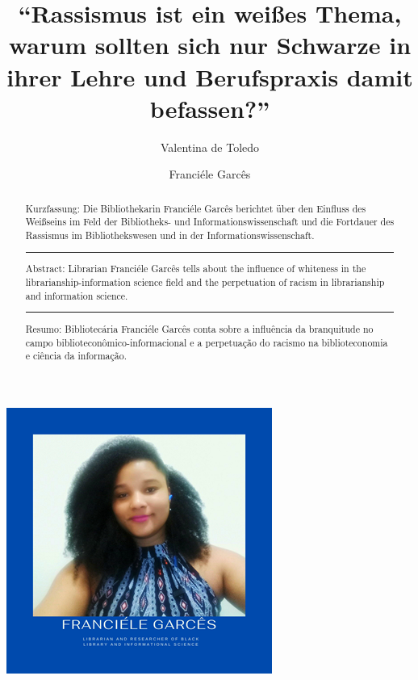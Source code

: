 \documentclass[a4paper,
fontsize=11pt,
oneside,
numbers=noperiodatend,
parskip=half-,
bibliography=totoc,
final
]{scrartcl}
\title{\LARGE{\enquote{Rassismus ist ein weißes Thema, warum sollten sich nur Schwarze in ihrer Lehre und Berufspraxis damit befassen?}}}%
\author{Valentina de Toledo \and Franciéle Garcês} %
\date{}
\begin{document}
\maketitle
\thispagestyle{fancyplain} 

\begin{abstract}
\noindent
Kurzfassung: Die Bibliothekarin Franciéle Garcês berichtet über den
Einfluss des Weißseins im Feld der Bibliotheks- und
Informationswissenschaft und die Fortdauer des Rassismus im
Bibliothekswesen und in der Informationswissenschaft.

\begin{center}\rule{0.5\linewidth}{0.5pt}\end{center}
\noindent
Abstract: Librarian Franciéle Garcês tells about the influence of
whiteness in the librarianship-information science field and the
perpetuation of racism in librarianship and information science.

\begin{center}\rule{0.5\linewidth}{0.5pt}\end{center}
\noindent
Resumo: Bibliotecária Franciéle Garcês conta sobre a influência da
branquitude no campo biblioteconômico-informacional e a perpetuação do
racismo na biblioteconomia e ciência da informação.
\end{abstract}

\begin{center}
\includegraphics{img/img1.PNG}
\end{center}
\end{document}
